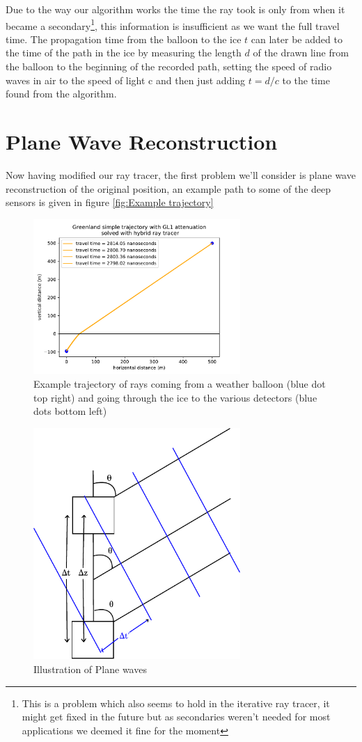 \documentclass[11pt,a4paper,faculty=we,language=en,doctype=report]{cls/ugent-doc}
\begin{document}
Due to the way our algorithm works the time the ray took is only from when it
became a secondary\footnote{This is a problem which also seems to hold in the 
iterative ray tracer, it might get fixed in the future but as
secondaries weren't needed for most applications we deemed it fine for the
moment}, this information is insufficient as we want the full travel time.  The
propagation time from the balloon to the ice $t$ can later be added to the time
of the path in the ice by measuring the length $d$ of the drawn line from the
balloon to the beginning of the recorded path, setting the speed of radio waves
in air to the speed of light c and then just adding $t = d/c$ to the time found
from the algorithm.
\section{Plane Wave Reconstruction}
Now having modified our ray tracer, the first problem we'll consider is
plane wave reconstruction of the original position, an example path
to some of the deep sensors is given in figure \ref{fig:Example
trajectory}
\begin{figure}
	\centering
	\includegraphics[width=0.7\textwidth]{weerballontraject.pdf}
	\caption{Example trajectory of rays coming from a weather balloon (blue dot top right) and going through the ice to the various detectors (blue dots bottom left)}
	\label{fig:Example trajectory}
\end{figure}
\begin{figure}
	\centering
	\includegraphics[width=0.7\textwidth]{planewave.pdf}
	\caption{Illustration of Plane waves}	
	\label{fig:Plane Wave}
\end{figure}
\end{document}
